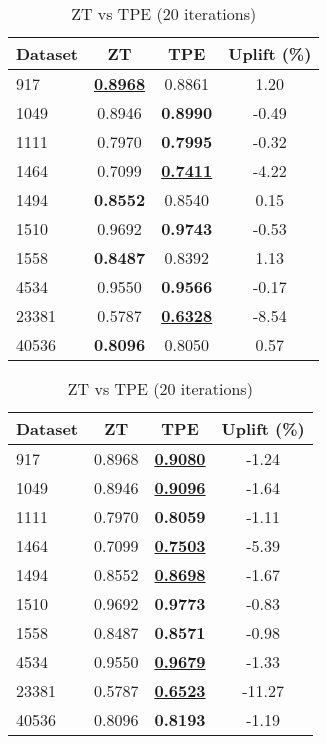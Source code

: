 \begin{table}[htbp]
\begin{center}
\begin{small}
\begin{sc}
\begin{subtable}[t]{0.48\textwidth}
    \centering
    \caption{ZT vs TPE (10 iterations)}
    \label{tab:decisiontree-zt-vs-tpe-10}
    \begin{tabular}{lccc}
    \toprule
    \textbf{Dataset} & \textbf{ZT} & \textbf{TPE} & \textbf{Uplift (\%)} \\
    \midrule
    917    & \underline{\textbf{0.8968}} & 0.8861 & 1.20 \\
    1049    & 0.8946 & \textbf{0.8990} & -0.49 \\
    1111    & 0.7970 & \textbf{0.7995} & -0.32 \\
    1464    & 0.7099 & \underline{\textbf{0.7411}} & -4.22 \\
    1494    & \textbf{0.8552} & 0.8540 & 0.15 \\
    1510    & 0.9692 & \textbf{0.9743} & -0.53 \\
    1558    & \textbf{0.8487} & 0.8392 & 1.13 \\
    4534    & 0.9550 & \textbf{0.9566} & -0.17 \\
    23381    & 0.5787 & \underline{\textbf{0.6328}} & -8.54 \\
    40536    & \textbf{0.8096} & 0.8050 & 0.57 \\
    \bottomrule
    \end{tabular}
\end{subtable}
\hfill
\begin{subtable}[t]{0.48\textwidth}
    \centering
    \caption{ZT vs TPE (20 iterations)}
    \label{tab:decisiontree-zt-vs-tpe-20}
    \begin{tabular}{lccc}
    \toprule
    \textbf{Dataset} & \textbf{ZT} & \textbf{TPE} & \textbf{Uplift (\%)} \\
    \midrule
    917    & 0.8968 & \underline{\textbf{0.9080}} & -1.24 \\
    1049    & 0.8946 & \underline{\textbf{0.9096}} & -1.64 \\
    1111    & 0.7970 & \textbf{0.8059} & -1.11 \\
    1464    & 0.7099 & \underline{\textbf{0.7503}} & -5.39 \\
    1494    & 0.8552 & \underline{\textbf{0.8698}} & -1.67 \\
    1510    & 0.9692 & \textbf{0.9773} & -0.83 \\
    1558    & 0.8487 & \textbf{0.8571} & -0.98 \\
    4534    & 0.9550 & \underline{\textbf{0.9679}} & -1.33 \\
    23381    & 0.5787 & \underline{\textbf{0.6523}} & -11.27 \\
    40536    & 0.8096 & \textbf{0.8193} & -1.19 \\
    \bottomrule
    \end{tabular}
\end{subtable}

\end{sc}
\end{small}
\end{center}
\vskip -0.1in
\end{table}
